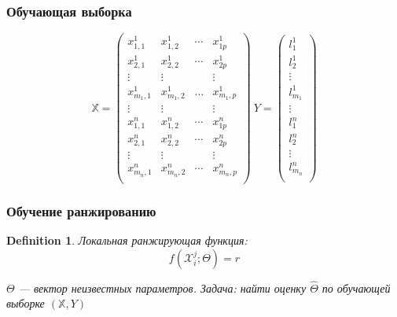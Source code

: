 \documentclass[unicode, notheorems]{beamer}
\newtheorem{definition}{Definition}
\begin{document}
\begin{frame}
\frametitle{Обучающая выборка}

\begin{equation*}
\mathbb X =
\begin{pmatrix}
x^1_{1, 1} & x^1_{1, 2} & \cdots & x^1_{1p} \\
x^1_{2, 1} & x^1_{2, 2} & \cdots & x^1_{2p} \\
\vdots & \vdots &  & \vdots \\
x^1_{m_1, 1} & x^1_{m_1, 2} & \ldots & x^1_{m_1, p} \\
\vdots & \vdots &  & \vdots \\
x^n_{1, 1} & x^n_{1, 2} & \cdots & x^n_{1p} \\
x^n_{2, 1} & x^n_{2, 2} & \cdots & x^n_{2p} \\
\vdots & \vdots &  & \vdots \\
x^n_{m_n, 1} & x^n_{m_n, 2} & \cdots & x^n_{m_n, p} \\
\end{pmatrix}\ 
Y =
\begin{pmatrix}
l^1_1 \\
l^1_2 \\
\vdots \\
l^1_{m_1}\\
\vdots \\
l^n_1 \\
l^n_2 \\
\vdots \\
l^n_{m_n}\\
\end{pmatrix}
\end{equation*}

\end{frame}

\begin{frame}
\frametitle{Обучение ранжированию}
\begin{definition}
Локальная ранжирующая функция:
\begin{equation*}
f(\mathcal X^j_i; \Theta) = r
\end{equation*}

$\Theta$ --- вектор неизвестных параметров. Задача: найти оценку $\hat\Theta$ по обучающей выборке $(\mathbb X, Y)$\ 
\end{definition}

\end{frame}
\end{document}
